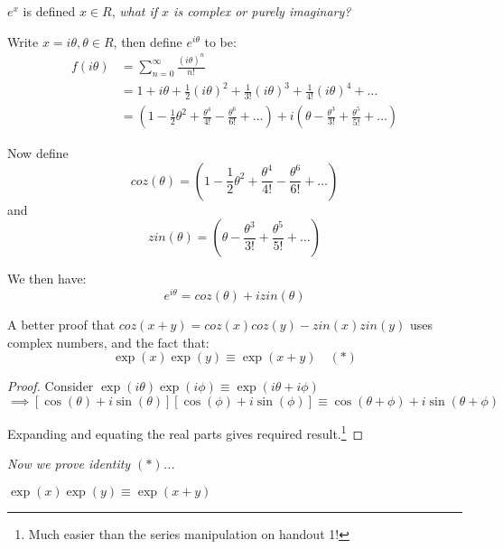 \documentclass[twoside]{scrartcl}
\begin{document}
$e^x$ is defined $x \in R$, \emph{ what if $x$ is complex or purely imaginary?}\vspace*{5pt}

\begin{definition}
Write $x = i\theta, \theta \in R$, then define $e^{i\theta}$ to be:
\[\begin{aligned}f(i \theta) &= \sum_{n=0}^{\infty} \frac{(i\theta)^n}{n!}\\
&= 1 + i\theta + \frac{1}{2}(i\theta)^2 + \frac{1}{3!}(i\theta)^3 + \frac{1}{4!}(i\theta)^4 + \dots\\
& = \left(1 - \frac{1}{2}\theta^2 + \frac{\theta^4}{4!} - \frac{\theta^6}{6!} + \dots\right) + i\left(\theta - \frac{\theta^3}{3!} + \frac{\theta^5}{5!} + \dots\right)\end{aligned}\]\vspace*{5pt}

Now define \[coz(\theta) = \left(1 - \frac{1}{2}\theta^2 + \frac{\theta^4}{4!} - \frac{\theta^6}{6!} + \dots\right)  \] and \[zin(\theta) = \left(\theta - \frac{\theta^3}{3!} + \frac{\theta^5}{5!} + \dots\right)\]

We then have: \[\boxed{e^{i\theta} = coz(\theta) + izin(\theta)}\]
\end{definition}


A 
better proof that $coz(x+y) = coz(x)coz(y) - zin(x)zin(y)$ uses complex numbers, and the fact that:
\[\boxed{\exp(x)\exp(y) \equiv \exp(x+y) \quad (*)}\]

\begin{proof}
Consider $\exp(i\theta)\exp(i\phi) \equiv \exp(i\theta + i\phi)$ 
\[\implies [\cos(\theta)+ i\sin(\theta)][\cos(\phi) + i\sin(\phi)] \equiv \cos(\theta + \phi) + i \sin(\theta + \phi)\]

Expanding and equating the real parts gives required result.\footnote{Much easier than the series manipulation on handout 1!
} \end{proof}

\emph{Now we prove identity $(*)$...}

\begin{proposition}
$\exp(x)\exp(y) \equiv \exp(x+y)$
\end{proposition}
\end{document}

